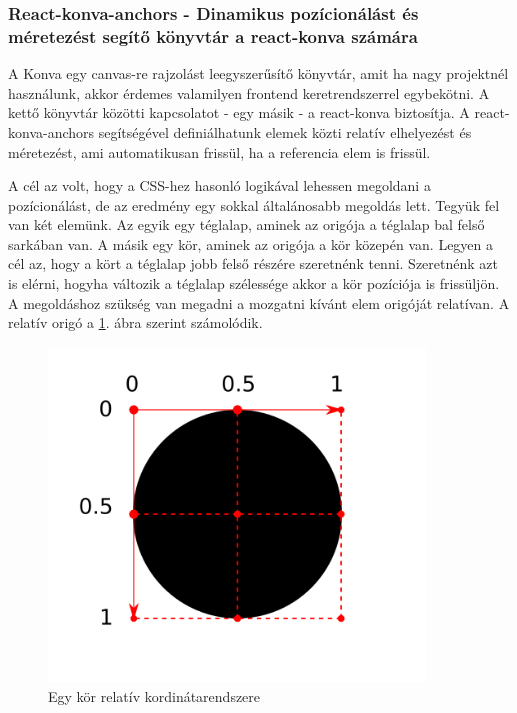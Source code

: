 \documentclass[a4paper,12pt,oneside]{report}
\begin{document}
\subsubsection{React-konva-anchors - Dinamikus pozícionálást és méretezést segítő könyvtár a react-konva számára}

\begin{justify}

	A Konva egy canvas-re rajzolást leegyszerűsítő könyvtár, amit ha nagy projektnél használunk, akkor érdemes valamilyen frontend keretrendszerrel egybekötni. A kettő könyvtár közötti kapcsolatot - egy másik - a react-konva biztosítja. A react-konva-anchors segítségével definiálhatunk elemek közti relatív elhelyezést és méretezést, ami automatikusan frissül, ha a referencia elem is frissül. 

	A cél az volt, hogy a CSS-hez hasonló logikával lehessen megoldani a pozícionálást, de az eredmény egy sokkal általánosabb megoldás lett. Tegyük fel van két elemünk. Az egyik egy téglalap, aminek az origója a téglalap bal felső sarkában van. A másik egy kör, aminek az origója a kör közepén van. Legyen a cél az, hogy a kört a téglalap jobb felső részére szeretnénk tenni. Szeretnénk azt is elérni, hogyha változik a téglalap szélessége akkor a kör pozíciója is frissüljön. A megoldáshoz szükség van megadni a mozgatni kívánt elem origóját relatívan. A relatív origó a \ref{fig:position_anchor}. ábra szerint számolódik.

    \begin{figure}[h]
        \centering
		\includegraphics[width=10cm]{contents/images/position_anchor.png}
		\caption{ Egy kör relatív kordinátarendszere}
		\label{fig:position_anchor}
	\end{figure}


\end{justify}
\end{document}
